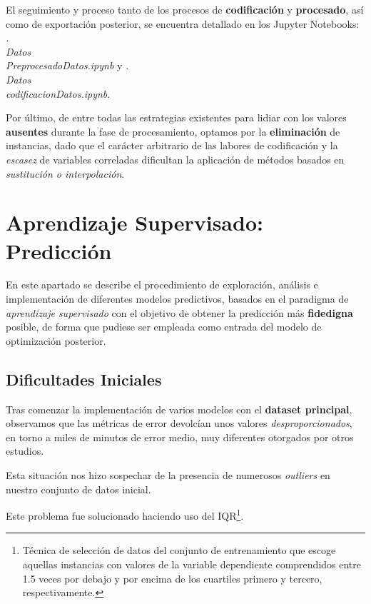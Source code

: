  El seguimiento y proceso tanto de los procesos de \textbf{codificación} y \textbf{procesado}, así como de exportación posterior, se encuentra detallado en los Jupyter Notebooks: \textit{.\\Datos\\PreprocesadoDatos.ipynb} y \textit{.\\Datos\\codificacionDatos.ipynb}.

Por último, de entre todas las estrategias\cite{Emmanuel2021ALearning} existentes para lidiar con los valores \textbf{ausentes} durante la fase de procesamiento, optamos por la \textbf{eliminación} de instancias, dado que el carácter arbitrario de las labores de codificación y la \textit{escasez} de variables correladas dificultan la aplicación de métodos basados en \textit{sustitución o interpolación}. 

\newpage

\section{Aprendizaje Supervisado: Predicción}

En este apartado se describe el procedimiento de exploración, análisis e implementación de diferentes modelos predictivos, basados en el paradigma de \textit{aprendizaje supervisado} con el objetivo de obtener la predicción más \textbf{fidedigna} posible, de forma que pudiese ser empleada como entrada del modelo de optimización posterior.

\subsection{Dificultades Iniciales}

Tras comenzar la implementación de varios modelos con el \textbf{dataset principal}, observamos que las métricas de error devolcían unos valores \textit{desproporcionados}, en torno a miles de minutos de error medio, muy diferentes  otorgados por otros estudios\cite{ShahabiKargar2014PredictingSurgery}.

Esta situación nos hizo sospechar de la presencia de numerosos \textit{outliers} en nuestro conjunto de datos inicial. 

Este problema fue solucionado haciendo uso del IQR\footnote{Técnica de selección de datos del conjunto de entrenamiento que escoge aquellas instancias con valores de la variable dependiente comprendidos entre 1.5 veces por debajo y por encima de los cuartiles primero y tercero, respectivamente.}\cite{Bonthu2021DetectingOutliers}.

